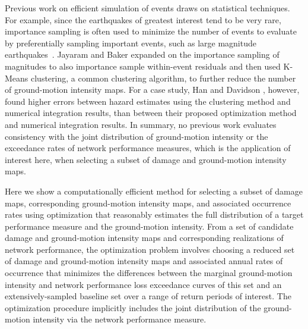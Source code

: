 Previous work on efficient simulation of events draws on statistical techniques. For example, since the earthquakes of greatest interest tend to be very rare, importance sampling is often used to minimize the number of events to evaluate by preferentially sampling important events, such as large magnitude earthquakes~\cite{stergiou_treatment_2006}.  Jayaram and Baker \cite{jayaram_efficient_2010} expanded on the importance sampling of magnitudes to also importance sample within-event residuals and then used K-Means clustering, a common clustering algorithm, to further reduce the number of ground-motion intensity maps. For a case study, Han and Davidson \cite{han_probabilistic_2012}, however, found higher errors between hazard estimates using the  clustering method and numerical integration results, than between their proposed optimization method  and numerical integration results. 
In summary, no previous work evaluates consistency with the joint distribution of ground-motion intensity or the exceedance rates of network performance measures, which is the application of interest here, when selecting a subset of damage and ground-motion intensity maps.


Here we show a computationally efficient method for selecting a subset of damage maps, corresponding ground-motion intensity maps, and associated occurrence rates using optimization that reasonably estimates the full distribution of a target performance measure and the ground-motion intensity.
From a set of candidate damage and ground-motion intensity maps and corresponding realizations of network performance, the optimization problem involves choosing a reduced set of damage and ground-motion intensity maps and associated annual rates of occurrence that minimizes the differences between the marginal ground-motion intensity and network performance loss exceedance curves of this set and an extensively-sampled baseline set over a range of return periods of interest. The optimization procedure implicitly includes the joint distribution of the ground-motion intensity via the network performance measure. 

